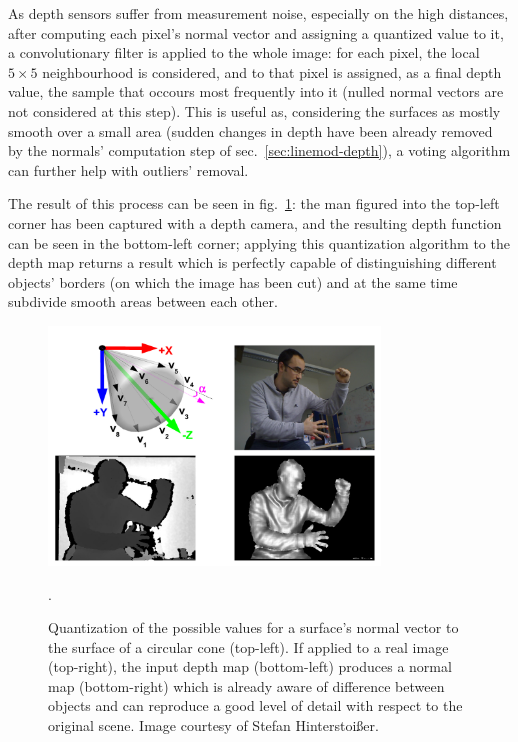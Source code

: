 As depth sensors suffer from measurement noise, especially on the high
distances, after computing each pixel's normal vector and assigning a
quantized value to it, a convolutionary filter is applied to the whole
image: for each pixel, the local $5\times 5$ neighbourhood is
considered, and to that pixel is assigned, as a final depth value, the
sample that occours most frequently into it (nulled normal vectors are
not considered at this step). This is useful as,
considering the surfaces as mostly smooth over a small area (sudden
changes in depth have been already removed by the normals' computation
step of sec.~\ref{sec:linemod-depth}), a voting algorithm can further
help with outliers' removal.

The result of this process can be seen in fig.~\ref{fig:depth-man}:
the man figured into the top-left corner has been captured with a
depth camera, and the resulting depth function can be seen in the
bottom-left corner; applying this quantization algorithm to the depth
map returns a result which is perfectly capable of distinguishing
different objects' borders (on which the image has been cut) and at
the same time subdivide smooth areas between each other.

\begin{figure}[htbp]
\centering
\includegraphics[height=2.5in]{./Graphics/depth-man}
\caption{Quantization of the possible values for a surface's normal
  vector to the surface of a circular cone (top-left). If applied to a
  real image (top-right), the input depth map (bottom-left) produces a
  normal map (bottom-right) which is already aware of difference
  between objects and can reproduce a good level of detail with
  respect to the original scene. Image courtesy of Stefan Hinterstoi\ss er. \label{fig:depth-man}}.
\end{figure}

